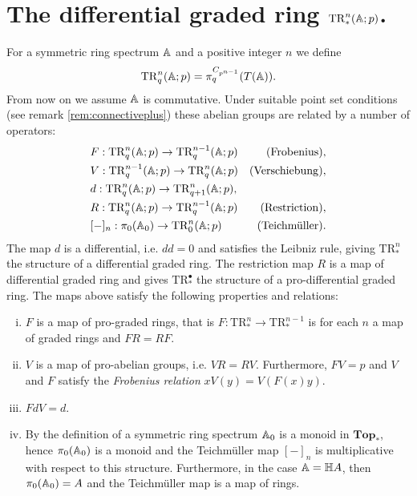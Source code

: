 \section{The differential graded ring $\mathrm{TR}^n_\ast(\mathbb{A};p)$.}\label{sec:wittcomplexes}
For a symmetric ring spectrum $\mathbb{A}$ and a positive integer $n$ we define
\[
\mathrm{TR}^n_q(\mathbb{A};p) = \pi_q^{C_{p^{n-1}}}(T(\mathbb{A})).
\] 
From now on we assume $\mathbb{A}$ is commutative.
Under suitable point set conditions (see remark \ref{rem:connectiveplus})
these abelian groups are related by a number of  operators:
\begin{align*}
&F:\mathrm{TR}^n_q(\mathbb{A};p)\rightarrow \mathrm{TR}^{n-1}_q(\mathbb{A};p) &(\mathrm{Frobenius}),\\
&V:\mathrm{TR}^{n-1}_q(\mathbb{A};p)\rightarrow \mathrm{TR}^{n}_q(\mathbb{A};p) &(\mathrm{Verschiebung}),\\
&d:\mathrm{TR}^n_q(\mathbb{A};p)\rightarrow \mathrm{TR}^n_{q+1}(\mathbb{A};p),\\
&R:\mathrm{TR}^n_q(\mathbb{A} ;p)\to \mathrm{TR}^{n-1}_q(\mathbb{A};p) &(\mathrm{Restriction}),\\
&[-]_n :\pi_0(\mathbb{A}_0)\to \mathrm{TR}^n_0(\mathbb{A};p) &(\text{Teichm\"uller}).
\end{align*}
The map $d$ is a differential, i.e. $dd = 0$ and satisfies the Leibniz rule,
giving $\mathrm{TR}^n_\ast$ the structure of a differential graded ring.
The restriction map $R$ is a map of differential graded ring and
gives $\mathrm{TR}^\bullet_\ast$ the structure of a pro-differential graded
ring. The maps above satisfy the following properties and relations:
\begin{enumerate}[(i)]
\item $F$ is a map of pro-graded rings, that is $F:\mathrm{TR}^n_\ast\to \mathrm{TR}^{n-1}_\ast$ is 
for each $n$ a map of graded rings and $FR = RF$.
\item $V$ is a map of pro-abelian groups, i.e. $VR = RV$. 
Furthermore, $FV = p$ and $V$ and $F$ satisfy the \textit{Frobenius relation} 
$xV(y) = V(F(x)y)$.
\item $FdV = d$.
\item By the definition of a symmetric ring spectrum $\mathbb{A}_0$ is a monoid in $\mathbf{Top}_\ast$, hence $\pi_0(\mathbb{A}_0)$ is a monoid
and the Teichm\"uller map $[-]_n$ is multiplicative with respect to this structure.
Furthermore, in the case $\mathbb{A} = \mathbb{H}A$, then $\pi_0(\mathbb{A}_0) = A$ and
the Teichm\"uller map is a map of rings.
\end{enumerate}

